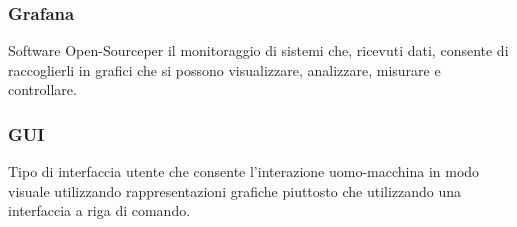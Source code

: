 \subsubsection*{Grafana}
Software Open-Source\glosp per il monitoraggio di sistemi che, ricevuti dati, consente di raccoglierli in grafici che si possono visualizzare, analizzare, misurare e controllare.

\subsubsection*{GUI}
Tipo di interfaccia utente che consente l'interazione uomo-macchina in modo visuale utilizzando rappresentazioni grafiche piuttosto che utilizzando una interfaccia a riga di comando.

